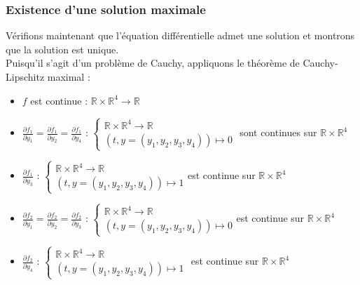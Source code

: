 \documentclass[9pt,a4paper]{article}
\begin{document}
\subsubsection{Existence d'une solution maximale}
Vérifions maintenant que l'équation différentielle admet une solution et montrons que la solution est unique.
\\Puisqu'il s'agit d'un problème de Cauchy, appliquons le théorème de Cauchy-Lipschitz maximal :
\begin{itemize}[label=\textbullet]
    \item $f$ est continue : $\mathbb{R} \times \mathbb{R}^4 \rightarrow \mathbb{R}$
    
    \item $\frac{\partial f_1}{\partial y_1} = \frac{\partial f_1}{\partial y_2} =\frac{\partial f_1}{\partial y_4}$ : 
    $\begin{cases}
        \mathbb{R} \times \mathbb{R}^4 \rightarrow \mathbb{R} \\
        (t,y=(y_1,y_2,y_3,y_4)) \mapsto 0
    \end{cases}$ sont continues sur $\mathbb{R} \times \mathbb{R}^4$
    
    \item $\frac{\partial f_1}{\partial y_3}$ : 
    $\begin{cases}
        \mathbb{R} \times \mathbb{R}^4 \rightarrow \mathbb{R} \\
        (t,y=(y_1,y_2,y_3,y_4)) \mapsto 1
    \end{cases}$est continue sur $\mathbb{R} \times \mathbb{R}^4$
    
    \item $\frac{\partial f_2}{\partial y_1} = \frac{\partial f_2}{\partial y_2} = \frac{\partial f_2}{\partial y_3}$ : 
    $\begin{cases}
        \mathbb{R} \times \mathbb{R}^4 \rightarrow \mathbb{R} \\
        (t,y=(y_1,y_2,y_3,y_4)) \mapsto 0
    \end{cases}$est continue sur $\mathbb{R} \times \mathbb{R}^4$
    
    \item $\frac{\partial f_2}{\partial y_4}$ : 
    $\begin{cases}
        \mathbb{R} \times \mathbb{R}^4 \rightarrow \mathbb{R} \\
        (t,y=(y_1,y_2,y_3,y_4)) \mapsto 1
    \end{cases}$ est continue sur $\mathbb{R} \times \mathbb{R}^4$


\end{itemize}
\end{document}

